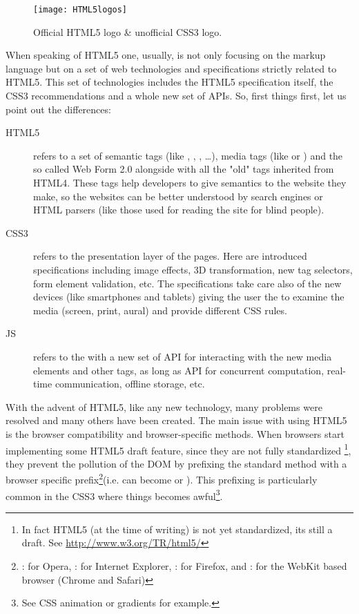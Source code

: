 \begin{figure}[htb]
    \centering
    \texttt{[image: HTML5logos]}
    \caption{Official HTML5 logo \& unofficial CSS3 logo.}
    \label{fig:html-logos}
\end{figure}

When speaking of \ac{HTML}5 one, usually, is not only focusing on the markup language
but on a set of web technologies and specifications strictly related to \ac{HTML}5.
This set of technologies includes the \ac{HTML}5 specification itself, the
\ac{CSS}3 recommendations and a whole new set of \js{} APIs. So, first things
first, let us point out the differences:
\begin{description}
	\item[HTML5] refers to a set of semantic tags (like ,
	, , \ldots), media tags (like  or
	) and the so called Web Form 2.0 alongside with all the "old"
	tags inherited from HTML4. These tags help developers to give semantics to
	the website they make, so the websites can be
	better understood by search engines or HTML parsers (like those used for
	reading the site for blind people).

	\item[CSS3] refers to the presentation layer of the pages. Here are introduced
	specifications including image effects, 3D transformation, new tag selectors, 
	form element validation, etc. The specifications take care also of the new
	devices (like smartphones and tablets) giving the user the  to examine the media (screen, print, aural) and provide different
	\ac{CSS} rules.
	
	\item[JS] refers to the \js{} with a new set of API for interacting with the
	new media elements and other tags, as long as API for concurrent computation,
	real-time communication, offline storage, etc.\\
\end{description}

With the advent of \ac{HTML}5, like any new technology, many problems were
resolved and many others have been created. The main issue with using \ac{HTML}5
is the browser compatibility and browser-specific methods. When browsers start
implementing some \ac{HTML}5 draft feature, since they are not fully standardized
\footnote{In fact HTML5 (at the time of writing) is not yet standardized, its
still a draft. See \url{http://www.w3.org/TR/html5/}}, they prevent the pollution
of the DOM by prefixing the standard method
with a browser specific prefix\footnote{: for
Opera, : for Internet Explorer, : for Firefox, and
: for the WebKit based browser (Chrome and Safari)}(i.e.
\linebreak{}
can become  or ). This prefixing
is particularly common in the \ac{CSS}3 where things becomes awful\footnote{See
CSS animation or gradients for example.}.\\


